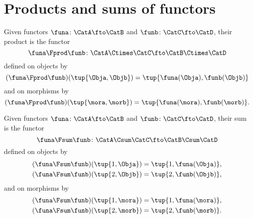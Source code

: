 \section{Products and sums of functors}
\label{sec:products-sums-functors}

\begin{ctdefinition}\label{def:product-of-functors}
Given functors $\funa \colon \CatA \fto \CatB$ and $\funb \colon \CatC \fto \CatD$, their product is the functor $$\funa \Fprod \funb \colon \CatA \Ctimes \CatC \fto \CatB \Ctimes \CatD$$
defined on objects by
\begin{equation}
(\funa \Fprod \funb) (\tup{\Obja, \Objb}) = \tup{\funa(\Obja), \funb(\Objb)}
\end{equation}
and on morphisms by 
\begin{equation}
(\funa \Fprod \funb) (\tup{\mora, \morb}) = \tup{\funa(\mora), \funb(\morb)}.
\end{equation}
\end{ctdefinition}

\begin{ctdefinition}\label{def:sum-of-functors}
Given functors $\funa \colon \CatA \fto \CatB$ and $\funb \colon \CatC \fto \CatD$, their sum is the functor $$\funa \Fsum \funb \colon \CatA \Csum \CatC \fto \CatB \Csum \CatD$$
defined on objects by
\begin{equation}
\begin{aligned}
(\funa \Fsum \funb) (\tup{1, \Obja}) = \tup{1, \funa(\Obja)}, \\
(\funa \Fsum \funb) (\tup{2, \Objb}) = \tup{2, \funb(\Objb)},
\end{aligned}
\end{equation}
and on morphisms by 
\begin{equation}
\begin{aligned}
(\funa \Fsum \funb) (\tup{1, \mora}) = \tup{1, \funa(\mora)}, \\
(\funa \Fsum \funb) (\tup{2, \morb}) = \tup{2, \funb(\morb)}.
\end{aligned}
\end{equation}
\end{ctdefinition}